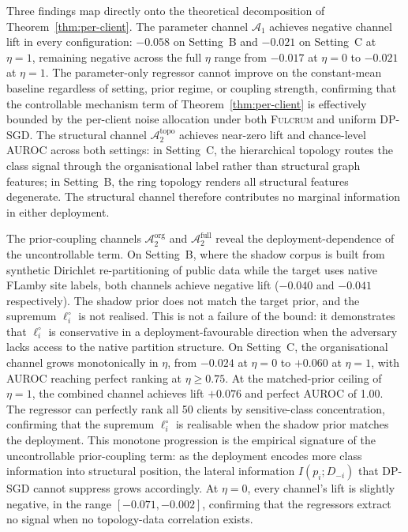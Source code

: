 \documentclass[letterpaper,journal]{IEEEtran}
\newcommand{\Fulcrum}{\textsc{Fulcrum}\xspace}
\begin{document}
Three findings map directly onto the theoretical decomposition of
Theorem~\ref{thm:per-client}. The parameter channel $\mathcal{A}_1$
achieves negative channel lift in every configuration: $-0.058$ on
Setting~B and $-0.021$ on Setting~C at $\eta = 1$, remaining
negative across the full $\eta$ range from $-0.017$ at $\eta = 0$
to $-0.021$ at $\eta = 1$. The parameter-only regressor cannot
improve on the constant-mean baseline regardless of setting, prior
regime, or coupling strength, confirming that the controllable
mechanism term of Theorem~\ref{thm:per-client} is effectively
bounded by the per-client noise allocation under both \Fulcrum and
uniform DP-SGD. The structural channel
$\mathcal{A}_2^{\text{topo}}$ achieves near-zero lift and
chance-level AUROC across both settings: in Setting~C, the
hierarchical topology routes the class signal through the
organisational label rather than structural graph features; in
Setting~B, the ring topology renders all structural features
degenerate. The structural channel therefore contributes no marginal
information in either deployment.

The prior-coupling channels $\mathcal{A}_2^{\text{org}}$ and
$\mathcal{A}_2^{\text{full}}$ reveal the deployment-dependence of
the uncontrollable term. On Setting~B, where the shadow corpus is
built from synthetic Dirichlet re-partitioning of public data while
the target uses native FLamby site labels, both channels achieve
negative lift ($-0.040$ and $-0.041$ respectively). The shadow
prior does not match the target prior, and the supremum
$\ell_i^\circ$ is not realised. This is not a failure of the bound:
it demonstrates that $\ell_i^\circ$ is conservative in a
deployment-favourable direction when the adversary lacks access to
the native partition structure. On Setting~C, the organisational
channel grows monotonically in $\eta$, from $-0.024$ at $\eta = 0$
to $+0.060$ at $\eta = 1$, with AUROC reaching perfect ranking at
$\eta \geq 0.75$. At the matched-prior ceiling of $\eta = 1$, the
combined channel achieves lift $+0.076$ and perfect AUROC of 1.00.
The regressor can perfectly rank all 50 clients by sensitive-class
concentration, confirming that the supremum $\ell_i^\circ$ is
realisable when the shadow prior matches the deployment. This
monotone progression is the empirical signature of the
uncontrollable prior-coupling term: as the deployment encodes more
class information into structural position, the lateral information
$I(p_i; D_{-i})$ that DP-SGD cannot suppress grows accordingly. At
$\eta = 0$, every channel's lift is slightly negative, in the range
$[-0.071, -0.002]$, confirming that the regressors extract no
signal when no topology-data correlation exists.
\end{document}
